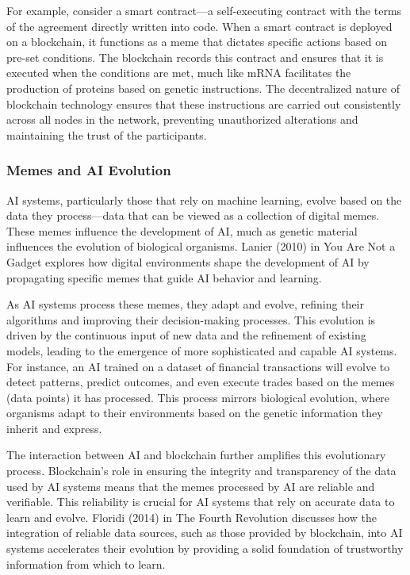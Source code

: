 \documentclass[12pt,twoside]{article}
\begin{document}
For example, consider a smart contract—a self-executing contract with the terms of the agreement directly written into code. When a smart contract is deployed on a blockchain, it functions as a meme that dictates specific actions based on pre-set conditions. The blockchain records this contract and ensures that it is executed when the conditions are met, much like mRNA facilitates the production of proteins based on genetic instructions. The decentralized nature of blockchain technology ensures that these instructions are carried out consistently across all nodes in the network, preventing unauthorized alterations and maintaining the trust of the participants.

\subsubsection{Memes and AI Evolution}

AI systems, particularly those that rely on machine learning, evolve based on the data they process—data that can be viewed as a collection of digital memes. These memes influence the development of AI, much as genetic material influences the evolution of biological organisms. Lanier (2010) in You Are Not a Gadget explores how digital environments shape the development of AI by propagating specific memes that guide AI behavior and learning.

As AI systems process these memes, they adapt and evolve, refining their algorithms and improving their decision-making processes. This evolution is driven by the continuous input of new data and the refinement of existing models, leading to the emergence of more sophisticated and capable AI systems. For instance, an AI trained on a dataset of financial transactions will evolve to detect patterns, predict outcomes, and even execute trades based on the memes (data points) it has processed. This process mirrors biological evolution, where organisms adapt to their environments based on the genetic information they inherit and express.

The interaction between AI and blockchain further amplifies this evolutionary process. Blockchain’s role in ensuring the integrity and transparency of the data used by AI systems means that the memes processed by AI are reliable and verifiable. This reliability is crucial for AI systems that rely on accurate data to learn and evolve. Floridi (2014) in The Fourth Revolution discusses how the integration of reliable data sources, such as those provided by blockchain, into AI systems accelerates their evolution by providing a solid foundation of trustworthy information from which to learn.
\end{document}
